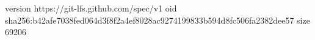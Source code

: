 version https://git-lfs.github.com/spec/v1
oid sha256:b42afe7038fed064d3f8f2a4ef8028ac9274199833b594d8fc506fa2382dee57
size 69206
